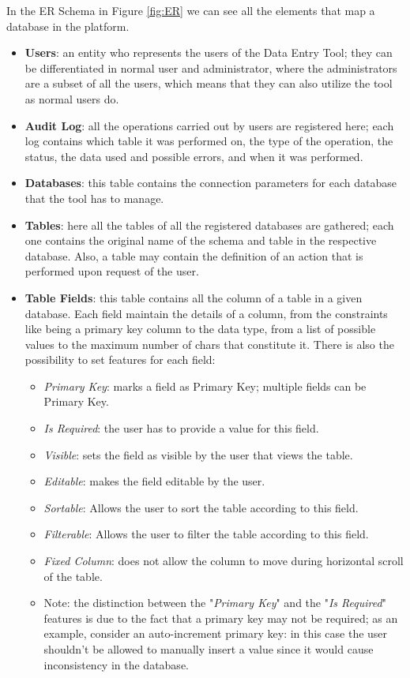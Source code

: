 In the ER Schema in Figure \ref{fig:ER} we can see all the elements that map a database in the platform.
\begin{itemize}
    \item \textbf{Users}: an entity who represents the users of the Data Entry Tool; they can be differentiated in normal user and administrator, where the administrators are a subset of all the users, which means that they can also utilize the tool as normal users do.
    
    \item \textbf{Audit Log}: all the operations carried out by users are registered here; each log contains which table it was performed on, the type of the operation, the status, the data used and possible errors, and when it was performed.
    
    \item \textbf{Databases}: this table contains the connection parameters for each database that the tool has to manage.
    
    \item \textbf{Tables}: here all the tables of all the registered databases are gathered; each one contains the original name of the schema and table in the respective database. Also, a table may contain the definition of an action that is performed upon request of the user.
    
    \item \textbf{Table Fields}: this table contains all the column of a table in a given database. Each field maintain the details of a column, from the constraints like being a primary key column to the data type, from a list of possible values to the maximum number of chars that constitute it. There is also the possibility to set features for each field:
    \begin{itemize}
        \item \emph{Primary Key}: marks a field as Primary Key; multiple fields can be Primary Key.
        \item \emph{Is Required}: the user has to provide a value for this field.
        \item \emph{Visible}: sets the field as visible by the user that views the table.
        \item \emph{Editable}: makes the field editable by the user.
        \item \emph{Sortable}: Allows the user to sort the table according to this field.
        \item \emph{Filterable}: Allows the user to filter the table according to this field.
        \item \emph{Fixed Column}: does not allow the column to move during horizontal scroll of the table.
        \item Note: the distinction between the "\emph{Primary Key}" and the "\emph{Is Required}" features is due to the fact that a primary key may not be required; as an example, consider an auto-increment primary key: in this case the user shouldn't be allowed to manually insert a value since it would cause inconsistency in the database.
    \end{itemize}
    

\end{itemize}
